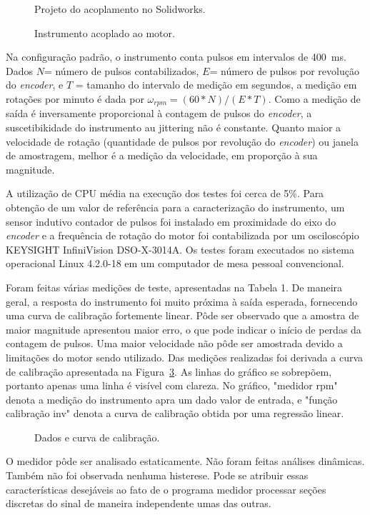 \documentclass[a4paper,9pt,twocolumn]{article}
\newcommand{\fig}[4][ht!]{
  \begin{figure}[#1]
    {\centering{\texttt{[image: \#2]}}\par}
    \caption{#3}
    \label{fig:#2}
  \end{figure}
}
\begin{document}
\fig{solidworks}{Projeto do acoplamento no Solidworks.}{width=\columnwidth}

\fig{setup}{Instrumento acoplado ao motor.}{width=\columnwidth}

Na configuração padrão, o instrumento conta pulsos em intervalos de 400~ms. Dados $N$= número de pulsos contabilizados, $E$= número de pulsos por revolução do \textit{encoder}, e $T$ = tamanho do intervalo de medição em segundos,  a medição em rotações por minuto é dada por $\omega_{rpm} = (60 * N)/(E * T)$. Como a medição de saída é inversamente proporcional à contagem de pulsos do \textit{encoder}, a suscetibikidade do instrumento au jittering não é constante. Quanto maior a velocidade de rotação (quantidade de pulsos por revolução do \textit{encoder}) ou janela de amostragem, melhor é a medição da velocidade, em proporção à sua magnitude.

A utilização de CPU média na execução dos testes foi cerca de 5\%. Para obtenção de um valor de referência para a caracterização do instrumento, um sensor indutivo contador de pulsos foi instalado em proximidade do eixo do \textit{encoder} e a frequência de rotação do motor foi contabilizada por um osciloscópio KEYSIGHT InfiniVision DSO-X-3014A. Os testes foram executados no sistema operacional Linux 4.2.0-18 em um computador de mesa pessoal convencional. 

Foram feitas várias medições de teste, apresentadas na Tabela 1. De maneira geral, a resposta do instrumento foi muito próxima à saída esperada, fornecendo uma curva de calibração fortemente linear. Pôde ser observado que a amostra de maior magnitude apresentou maior erro, o que pode indicar o início de perdas da contagem de pulsos. Uma maior velocidade não pôde ser amostrada devido a limitações do motor sendo utilizado.
Das medições realizadas foi derivada a curva de calibração apresentada na Figura~\ref{fig:data2}. As linhas do gráfico se sobrepõem, portanto apenas uma linha é visível com clareza. No gráfico, "medidor rpm" denota a medição do instrumento apra um dado valor de entrada, e "função calibração inv" denota a curva de calibração obtida por uma regressão linear.

\fig{data2}{Dados e curva de calibração.}{width=\columnwidth}

O medidor pôde ser analisado estaticamente. Não foram feitas análises dinâmicas. Também não foi observada nenhuma histerese. Pode se atribuir essas características desejáveis ao fato de o programa medidor processar seções discretas do sinal de maneira independente umas das outras.
\end{document}
